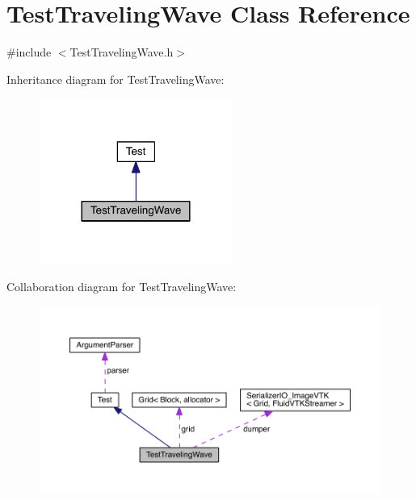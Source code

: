 \hypertarget{class_test_traveling_wave}{}\section{Test\+Traveling\+Wave Class Reference}
\label{class_test_traveling_wave}


{\ttfamily \#include $<$Test\+Traveling\+Wave.\+h$>$}



Inheritance diagram for Test\+Traveling\+Wave\+:\nopagebreak
\begin{figure}[H]
\begin{center}
\leavevmode
\includegraphics[width=180pt]{dd/d0c/class_test_traveling_wave__inherit__graph}
\end{center}
\end{figure}


Collaboration diagram for Test\+Traveling\+Wave\+:\nopagebreak
\begin{figure}[H]
\begin{center}
\leavevmode
\includegraphics[width=350pt]{df/d7a/class_test_traveling_wave__coll__graph}
\end{center}
\end{figure}
